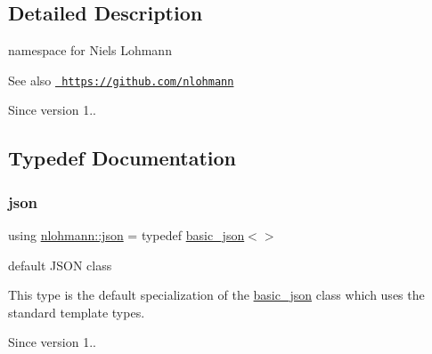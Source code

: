 \subsection{Detailed Description}
namespace for Niels Lohmann 

\begin{DoxySeeAlso}{See also}
\href{https://github.com/nlohmann}{\texttt{ https\+://github.\+com/nlohmann}} 
\end{DoxySeeAlso}
\begin{DoxySince}{Since}
version 1.. 
\end{DoxySince}


\subsection{Typedef Documentation}
\mbox{\label{namespacenlohmann_a2bfd99e845a2e5cd90aeaf1b1431f474}} 
\subsubsection{\texorpdfstring{json}{json}}
{\footnotesize\ttfamily using \mbox{\hyperlink{namespacenlohmann_a2bfd99e845a2e5cd90aeaf1b1431f474}{nlohmann\+::json}} = typedef \mbox{\hyperlink{classnlohmann_1_1basic__json}{basic\+\_\+json}}$<$$>$}



default J\+S\+ON class 

This type is the default specialization of the \mbox{\hyperlink{classnlohmann_1_1basic__json}{basic\+\_\+json}} class which uses the standard template types.

\begin{DoxySince}{Since}
version 1.. 
\end{DoxySince}
